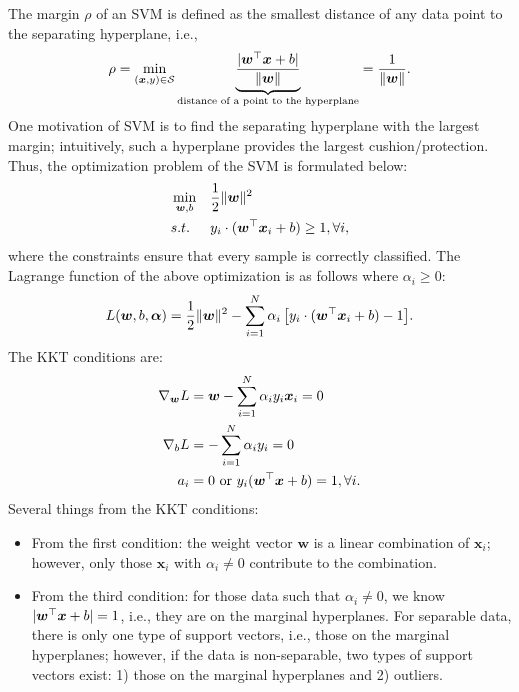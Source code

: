         The margin $\rho$ of an SVM is defined as the smallest distance of any data point to the separating hyperplane, i.e., 
            \begin{equation}
                \rho = \min_{(\bm{x}, y) \in \mathcal{S}} \underbrace{\frac{| \bm{w}^\top \bm{x} + b |}{\lVert\bm{w}\rVert}}_{\text{distance of a point to the hyperplane}} = \frac{1}{\lVert\bm{w}\rVert}.
            \end{equation}
        One motivation of SVM is to find the separating hyperplane with the largest margin; intuitively, such a hyperplane provides the largest cushion/protection.
        Thus, the optimization problem of the SVM is formulated below:
            \begin{equation}
                \begin{aligned}
                    & \min_{\bm{w}, b} & & \frac{1}{2}\lVert\bm{w}\rVert^2 \\
                    & s.t.             & & y_i \cdot (\bm{w}^\top \bm{x}_i + b) \ge 1, \forall i,
                \end{aligned}
            \end{equation}
        where the constraints ensure that every sample is correctly classified.
        The Lagrange function of the above optimization is as follows where $\alpha_i \ge 0$:
            \begin{equation}
                L(\bm{w}, b, \bm{\alpha}) = \frac{1}{2}\lVert\bm{w}\rVert^2 - \sum_{i=1}^{N}{\alpha_i \left[ y_i \cdot (\bm{w}^\top \bm{x}_i + b) - 1\right]}.
            \end{equation}
        The KKT conditions are:
            \begin{equation}
                \begin{aligned}
                    \nabla_{\bm{w}} L & = \bm{w} - \sum_{i=1}^{N}{\alpha_i y_i \bm{x}_i} = 0 \\
                    \nabla_{b} L & = -\sum_{i=1}^{N}{\alpha_i y_i} = 0 \\
                    a_i & = 0 \text{ or } y_i(\bm{w}^\top \bm{x} + b) = 1, \forall i.
                \end{aligned}
            \end{equation}
        Several things from the KKT conditions:
            \begin{itemize}
                \item From the first condition: the weight vector $\bm{w}$ is a linear combination of $\bm{x}_i$; however, only those $\bm{x}_i$ with $\alpha_i \ne 0$ contribute to the combination.
                \item From the third condition: for those data such that $\alpha_i \ne 0$, we know $| \bm{w}^\top \bm{x} + b | = 1$, i.e., they are on the marginal hyperplanes.
                For separable data, there is only one type of support vectors, i.e., those on the marginal hyperplanes; however, if the data is non-separable, two types of support vectors exist: 1) those on the marginal hyperplanes and 2) outliers. 
            \end{itemize}
